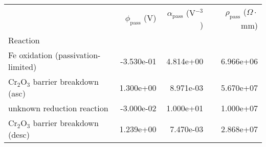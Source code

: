 \begin{tabular}{lrrr}
\toprule
{} &  $\phi_{\text{pass}}$ (V) &  $\alpha_{\text{pass}}$ (V$^{-3}$) &  $\rho_{\text{pass}}$ ($\Omega \cdot$mm) \\
Reaction                             &                           &                                    &                                          \\
\midrule
Fe oxidation (passivation-limited)   &                -3.530e-01 &                          4.814e+00 &                                6.966e+06 \\
Cr$_2$O$_3$ barrier breakdown (asc)  &                 1.300e+00 &                          8.971e-03 &                                5.670e+07 \\
unknown reduction reaction           &                -3.000e-02 &                          1.000e+01 &                                1.000e+07 \\
Cr$_2$O$_3$ barrier breakdown (desc) &                 1.239e+00 &                          7.470e-03 &                                2.868e+07 \\
\bottomrule
\end{tabular}
